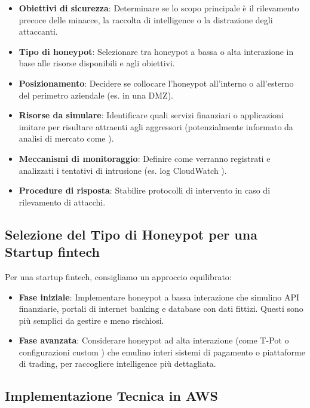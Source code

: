 \begin{itemize}
    \item \textbf{Obiettivi di sicurezza}: Determinare se lo scopo principale è il rilevamento precoce delle minacce, la raccolta di intelligence o la distrazione degli attaccanti.
    \item \textbf{Tipo di honeypot}: Selezionare tra honeypot a bassa o alta interazione in base alle risorse disponibili e agli obiettivi.
    \item \textbf{Posizionamento}: Decidere se collocare l'honeypot all'interno o all'esterno del perimetro aziendale (es. in una DMZ).
    \item \textbf{Risorse da simulare}: Identificare quali servizi finanziari o applicazioni imitare per risultare attraenti agli aggressori (potenzialmente informato da analisi di mercato come \cite{fricano2017}).
    \item \textbf{Meccanismi di monitoraggio}: Definire come verranno registrati e analizzati i tentativi di intrusione (es. log CloudWatch \cite{cloudwatch_pricing}).
    \item \textbf{Procedure di risposta}: Stabilire protocolli di intervento in caso di rilevamento di attacchi.
\end{itemize}

\subsection{Selezione del Tipo di Honeypot per una Startup fintech}
\label{subsec:selezione_tipo}

Per una startup fintech, consigliamo un approccio equilibrato:

\begin{itemize}
    \item \textbf{Fase iniziale}: Implementare honeypot a bassa interazione che simulino API finanziarie, portali di internet banking e database con dati fittizi. Questi sono più semplici da gestire e meno rischiosi.
    \item \textbf{Fase avanzata}: Considerare honeypot ad alta interazione (come T-Pot \cite{zhang_2023} o configurazioni custom \cite{tsang_2022}) che emulino interi sistemi di pagamento o piattaforme di trading, per raccogliere intelligence più dettagliata.
\end{itemize}

\subsection{Implementazione Tecnica in AWS}
\label{subsec:implementazione_tecnica}

